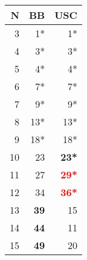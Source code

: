 \begin{tabular}{r|r|r}
 N&BB &USC\\
 \hline
 3&1*&1*\\
 4&3*&3*\\
 5&4*&4*\\
 6&7*&7*\\
 7&9*&9*\\
 8&13*&13*\\
 9&18*&18*\\
 10&23&\textbf{23*}\\
 11&27&\textbf{\textcolor{red}{29*}}\\
 12&34&\textbf{\textcolor{red}{36*}}\\
 13&\textbf{39}&15\\
 14&\textbf{44}&11\\
 15&\textbf{49}&20\\\hline
\end{tabular}

